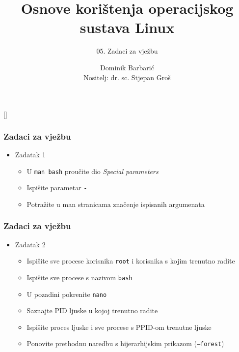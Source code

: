 \documentclass[table,usenames,dvipsnames]{beamer}
\title{Osnove korištenja operacijskog sustava Linux}
\subtitle{05. Zadaci za vježbu}
\author[Dominik Barbarić]{Dominik Barbarić\\ \small{Nositelj: dr. sc. Stjepan Groš}}
\institute[FER]{Sveučilište u Zagrebu \\
				Fakultet elektrotehnike i računarstva}
\date{\todayiso}
\newcommand{\shell}[1]{\texttt{#1}}
\begin{document}
{
[] %

\begin{frame}
\maketitle
\end{frame}
}

\begin{frame}[t]
	\frametitle{Zadaci za vježbu}
	\begin{itemize}
		\item Zadatak 1
		\begin{itemize}
			\item U \shell{man bash} proučite dio \emph{Special parameters}
			\item Ispišite parametar \shell{-}
			\item Potražite u man stranicama značenje ispisanih argumenata
		\end{itemize}
	\end{itemize}
\end{frame}

\begin{frame}[t]
	\frametitle{Zadaci za vježbu}
	\begin{itemize}
		\item Zadatak 2
		\begin{itemize}
			\item Ispišite sve procese korisnika \shell{root} i korisnika s kojim trenutno radite
			\item Ispišite sve procese s nazivom \shell{bash}
			\item U pozadini pokrenite \shell{nano}
			\item Saznajte PID ljuske u kojoj trenutno radite
			\item Ispišite proces ljuske i sve procese s PPID-om trenutne ljuske
			\item Ponovite prethodnu naredbu s hijerarhijskim prikazom (\shell{--forest})
		\end{itemize}
	\end{itemize}
\end{frame}
\end{document}
